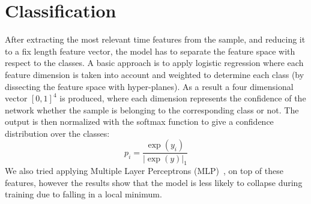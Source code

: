 \section{Classification}
After extracting the most relevant time features from the sample, and reducing it to a fix length feature vector, the model has to separate the feature space with respect to the classes.
A basic approach is to apply logistic regression where each feature dimension is taken into account and weighted to determine each class (by dissecting the feature space with hyper-planes).
As a result a four dimensional vector $[0, 1]^4$ is produced, where each dimension represents the confidence of the network whether the sample is belonging to the corresponding class or not. The output is then normalized with the softmax function to give a confidence distribution over the classes:
\begin{equation}
p_i = \frac{\exp(y_i)}{|\exp(y)|_1}
\end{equation}
We also tried applying Multiple Layer Perceptrons (MLP)~\cite{girshick2014rich}, on  top of these features, however the results show that the model is less likely to collapse during training due to falling in a local minimum.

